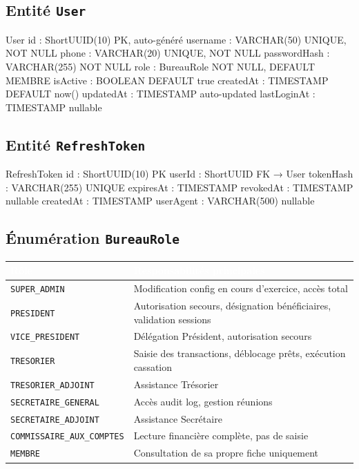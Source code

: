 \documentclass[12pt, a4paper]{report}
\begin{document}
\subsection{Entité \texttt{User}}

\begin{codeBox}
User {
  id            : ShortUUID(10)   PK, auto-généré
  username      : VARCHAR(50)     UNIQUE, NOT NULL
  phone         : VARCHAR(20)     UNIQUE, NOT NULL
  passwordHash  : VARCHAR(255)    NOT NULL
  role          : BureauRole      NOT NULL, DEFAULT MEMBRE
  isActive      : BOOLEAN         DEFAULT true
  createdAt     : TIMESTAMP       DEFAULT now()
  updatedAt     : TIMESTAMP       auto-updated
  lastLoginAt   : TIMESTAMP       nullable
}
\end{codeBox}

\subsection{Entité \texttt{RefreshToken}}

\begin{codeBox}
RefreshToken {
  id          : ShortUUID(10)   PK
  userId      : ShortUUID       FK → User
  tokenHash   : VARCHAR(255)    UNIQUE
  expiresAt   : TIMESTAMP
  revokedAt   : TIMESTAMP       nullable
  createdAt   : TIMESTAMP
  userAgent   : VARCHAR(500)    nullable
}
\end{codeBox}

\subsection{Énumération \texttt{BureauRole}}

\begin{center}
\begin{tabular}{L{4.5cm}L{9cm}}
  \toprule
  \textcolor{white}{\textbf{Rôle}} &
  \textcolor{white}{\textbf{Responsabilités principales}} \\
  \midrule
  \texttt{SUPER\_ADMIN}             & Modification config en cours d'exercice, accès total \\
  \texttt{PRESIDENT}                & Autorisation secours, désignation bénéficiaires, validation sessions \\
  \texttt{VICE\_PRESIDENT}          & Délégation Président, autorisation secours \\
  \texttt{TRESORIER}                & Saisie des transactions, déblocage prêts, exécution cassation \\
  \texttt{TRESORIER\_ADJOINT}       & Assistance Trésorier \\
  \texttt{SECRETAIRE\_GENERAL}      & Accès audit log, gestion réunions \\
  \texttt{SECRETAIRE\_ADJOINT}      & Assistance Secrétaire \\
  \texttt{COMMISSAIRE\_AUX\_COMPTES}& Lecture financière complète, pas de saisie \\
  \texttt{MEMBRE}                   & Consultation de sa propre fiche uniquement \\
  \bottomrule
\end{tabular}
\end{center}
\end{document}
